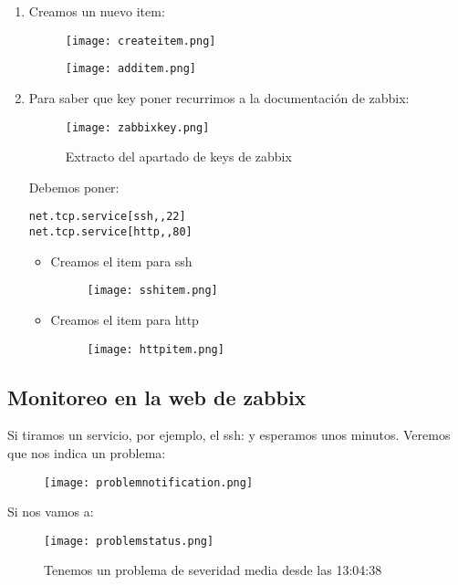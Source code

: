 \begin{enumerate}
	\item Creamos un nuevo item:
\begin{figure}[H]
	\centering
	\texttt{[image: createitem.png]} 	
\end{figure}
\begin{figure}[H]
	\centering
	\texttt{[image: additem.png]} 
\end{figure}

	\item Para saber que key poner recurrimos a la documentación de zabbix: 
\begin{figure}[H]
	\centering
	\texttt{[image: zabbixkey.png]} 
	\caption{Extracto del apartado de keys de zabbix \cite{zabbixKeys}}
\end{figure}
Debemos poner: 
\begin{verbatim}
net.tcp.service[ssh,,22]
net.tcp.service[http,,80]
\end{verbatim}
	\begin{itemize}
		\item Creamos el item para ssh
		\begin{figure}[H]
			\centering
			\texttt{[image: sshitem.png]} 
		\end{figure}
		\item Creamos el item para http
		\begin{figure}[H]
			\centering
			\texttt{[image: httpitem.png]} 
		\end{figure}
	\end{itemize}

\end{enumerate}

\subsection{Monitoreo en la web de zabbix}
Si tiramos un servicio, por ejemplo, el ssh:  y esperamos unos minutos.
Veremos que nos indica un problema:
		\begin{figure}[H]
		\centering
		\texttt{[image: problemnotification.png]} 
		\end{figure}
Si nos vamos a: \\
\begin{figure}[H]
	\centering
	\texttt{[image: problemstatus.png]}
	\caption{Tenemos un problema de severidad media desde las 13:04:38}
\end{figure}


